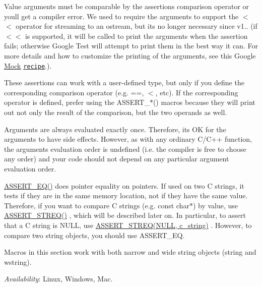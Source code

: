 Value arguments must be comparable by the assertion\textquotesingle{}s comparison operator or you\textquotesingle{}ll get a compiler error. We used to require the arguments to support the {\ttfamily $<$$<$} operator for streaming to an {\ttfamily ostream}, but it\textquotesingle{}s no longer necessary since v1.. (if {\ttfamily $<$$<$} is supported, it will be called to print the arguments when the assertion fails; otherwise Google Test will attempt to print them in the best way it can. For more details and how to customize the printing of the arguments, see this Google \hyperlink{classMock}{Mock} \href{../../googlemock/docs/CookBook.md#teaching-google-mock-how-to-print-your-values}{\tt recipe}.).

These assertions can work with a user-\/defined type, but only if you define the corresponding comparison operator (e.\+g. {\ttfamily ==}, {\ttfamily $<$}, etc). If the corresponding operator is defined, prefer using the {\ttfamily A\+S\+S\+E\+R\+T\+\_\+$\ast$()} macros because they will print out not only the result of the comparison, but the two operands as well.

Arguments are always evaluated exactly once. Therefore, it\textquotesingle{}s OK for the arguments to have side effects. However, as with any ordinary C/\+C++ function, the arguments\textquotesingle{} evaluation order is undefined (i.\+e. the compiler is free to choose any order) and your code should not depend on any particular argument evaluation order.

{\ttfamily \hyperlink{gtest_8h_a1a6db8b1338ee7040329322b77779086}{A\+S\+S\+E\+R\+T\+\_\+\+E\+Q()}} does pointer equality on pointers. If used on two C strings, it tests if they are in the same memory location, not if they have the same value. Therefore, if you want to compare C strings (e.\+g. {\ttfamily const char$\ast$}) by value, use {\ttfamily \hyperlink{gtest_8h_a74f4189ea570bab9a65d47104659ef9c}{A\+S\+S\+E\+R\+T\+\_\+\+S\+T\+R\+E\+Q()}} , which will be described later on. In particular, to assert that a C string is {\ttfamily N\+U\+LL}, use {\ttfamily \hyperlink{gtest_8h_a74f4189ea570bab9a65d47104659ef9c}{A\+S\+S\+E\+R\+T\+\_\+\+S\+T\+R\+E\+Q(\+N\+U\+L\+L, c\+\_\+string)}} . However, to compare two {\ttfamily string} objects, you should use {\ttfamily A\+S\+S\+E\+R\+T\+\_\+\+EQ}.

Macros in this section work with both narrow and wide string objects ({\ttfamily string} and {\ttfamily wstring}).

{\itshape Availability}\+: Linux, Windows, Mac.

